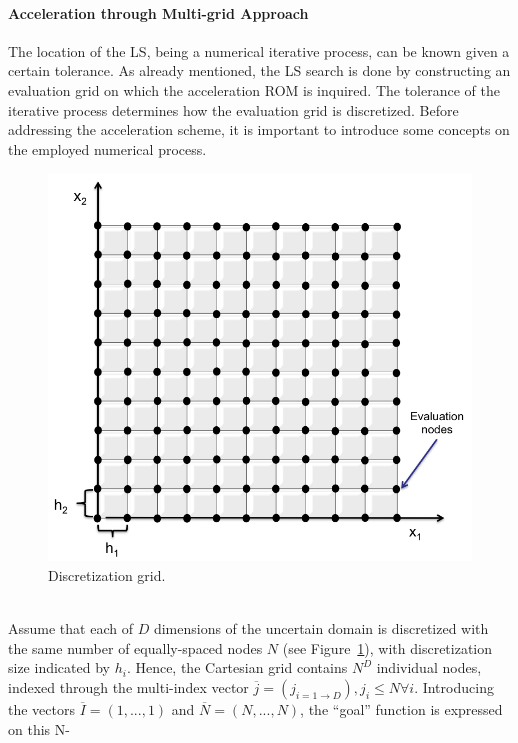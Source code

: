 \paragraph{Acceleration through Multi-grid Approach}
\label{par:LSaccelerationMultiGrid}
The location of the LS, being a numerical iterative process, can be 
known given a certain tolerance. As already mentioned, the LS search 
is done by constructing an evaluation grid on which the acceleration 
ROM is inquired. The tolerance of the iterative process determines how 
the evaluation grid is discretized. Before addressing the acceleration 
scheme, it is important 
to introduce some concepts on the employed numerical process.
\begin{figure}[h!]
  \centering
  \includegraphics[width=1.0\textwidth]  {pics/DiscretizationGrid.png}
  \caption{Discretization grid.}
  \label{fig:DiscretizationGrid}
\end{figure}
\\Assume that each of $D$ dimensions of the uncertain domain is 
discretized with the same number of equally-spaced nodes $N$ (see 
Figure~\ref{fig:DiscretizationGrid}), with discretization size indicated 
by $h_{i}$. Hence, the Cartesian grid contains $N^{D}$ individual 
nodes, indexed through the multi-index vector $\overline{j} = \left ( 
j_{i=1\rightarrow D} \right ), j_{i} \leq N \forall i$. Introducing the 
vectors  $\overline{I} = (1, ..., 1)$ and
$\overline{N} = (N, ..., N)$, the ``goal'' function is expressed on this N-
